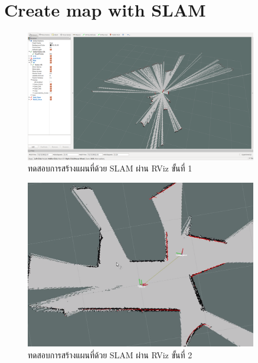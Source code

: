\documentclass{classes/fiboreport}
\begin{document}
\section{Create map with SLAM}
\begin{figure}[!ht]
	\centering
	\includegraphics[width=0.9\textwidth]{images/map_slam1.png}
	\caption{ทดสอบการสร้างแผนที่ด้วย SLAM ผ่าน RViz ขั้นที่ 1}
	\label{fig:map_slam1}
\end{figure}


\begin{figure}[!ht]
	\centering
	\includegraphics[width=0.9\textwidth]{images/map_slam3.png}
	\caption{ทดสอบการสร้างแผนที่ด้วย SLAM ผ่าน RViz ขั้นที่ 2}
	\label{fig:map_slam3}
\end{figure}

\clearpage
\end{document}
